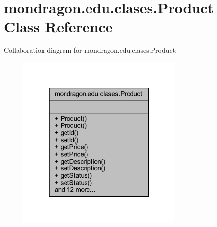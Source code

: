 \hypertarget{classmondragon_1_1edu_1_1clases_1_1_product}{}\section{mondragon.\+edu.\+clases.\+Product Class Reference}
\label{classmondragon_1_1edu_1_1clases_1_1_product}


Collaboration diagram for mondragon.\+edu.\+clases.\+Product\+:\nopagebreak
\begin{figure}[H]
\begin{center}
\leavevmode
\includegraphics[width=232pt]{classmondragon_1_1edu_1_1clases_1_1_product__coll__graph}
\end{center}
\end{figure}
